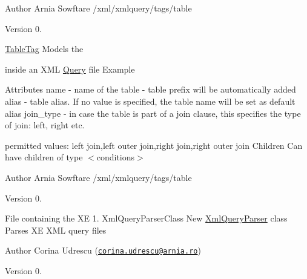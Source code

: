 \begin{DoxyAuthor}{Author}
Arnia Sowftare /xml/xmlquery/tags/table 
\end{DoxyAuthor}
\begin{DoxyVersion}{Version}
0.
\end{DoxyVersion}
\hyperlink{classTableTag}{Table\+Tag} Models the \begin{TabularC}{0}
\hline
\end{TabularC}
inside an X\+M\+L \hyperlink{classQuery}{Query} file  Example \begin{TabularC}{0}
\hline
\end{TabularC}
Attributes name -\/ name of the table -\/ table prefix will be automatically added alias -\/ table alias. If no value is specified, the table name will be set as default alias join\+\_\+type -\/ in case the table is part of a join clause, this specifies the type of join\+: left, right etc.
\begin{DoxyItemize}
\item permitted values\+: \textquotesingle{}left join\textquotesingle{},\textquotesingle{}left outer join\textquotesingle{},\textquotesingle{}right join\textquotesingle{},\textquotesingle{}right outer join\textquotesingle{} Children Can have children of type $<$conditions$>$
\end{DoxyItemize}

\begin{DoxyAuthor}{Author}
Arnia Sowftare /xml/xmlquery/tags/table 
\end{DoxyAuthor}
\begin{DoxyVersion}{Version}
0.
\end{DoxyVersion}
File containing the X\+E 1. Xml\+Query\+Parser\+Class New \hyperlink{classXmlQueryParser}{Xml\+Query\+Parser} class ~\newline
 Parses X\+E X\+M\+L query files

\begin{DoxyAuthor}{Author}
Corina Udrescu (\href{mailto:corina.udrescu@arnia.ro}{\tt corina.\+udrescu@arnia.\+ro})  
\end{DoxyAuthor}
\begin{DoxyVersion}{Version}
0. 
\end{DoxyVersion}
